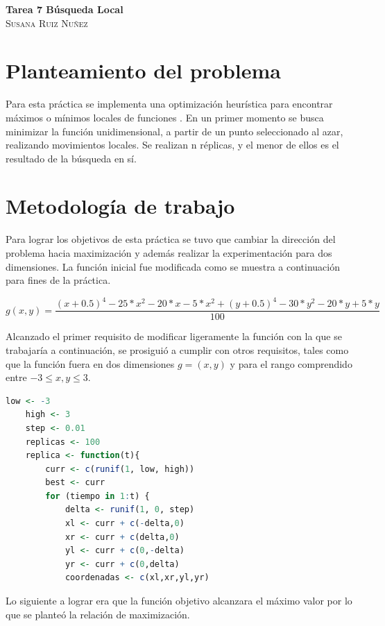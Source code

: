 \documentclass{article}
\begin{document}
	\begin{center}
	\huge{\textbf{Tarea 7 Búsqueda Local}}\\
	
	\textsc{ \Large Susana Ruiz Nuñez}
	\end{center}


\section{Planteamiento del problema} 
Para esta práctica se implementa una optimización heurística para encontrar máximos o mínimos locales de funciones \cite{satu}. En un primer momento se busca minimizar la función unidimensional, a partir de un punto seleccionado al azar, realizando movimientos locales. Se realizan n  réplicas, y el menor de ellos es el resultado de la búsqueda en sí.

\section{Metodología de trabajo}
Para lograr los objetivos de esta práctica se tuvo que cambiar la dirección del problema hacia maximización y además realizar la experimentación para dos dimensiones. La función inicial fue modificada como se muestra a continuación para fines de la práctica. 

\begin{equation}
	\label{eq:e1}
	g(x,y)= \frac{(x + 0.5)^4 - 25 * x^2 - 20 * x - 5 * x^2 + (y + 0.5)^4 - 30 * y^2 - 20 * y + 5 * y}{100} 
\end{equation}

Alcanzado el primer requisito de modificar ligeramente la función con la que se trabajaría a continuación, se prosiguió a cumplir con otros requisitos, tales como que la función fuera en dos dimensiones $g = (x, y)$ y para el rango comprendido entre $-3\leq x,y \leq 3$.
 
\begin{lstlisting}[language=R]
	low <- -3
	high <- 3
	step <- 0.01
	replicas <- 100
	replica <- function(t){
		curr <- c(runif(1, low, high))
		best <- curr
		for (tiempo in 1:t) {
			delta <- runif(1, 0, step)
			xl <- curr + c(-delta,0)
			xr <- curr + c(delta,0)
			yl <- curr + c(0,-delta)
			yr <- curr + c(0,delta)
			coordenadas <- c(xl,xr,yl,yr)
\end{lstlisting}

Lo siguiente a lograr era que la función objetivo alcanzara el máximo valor por lo que se planteó la relación de maximización.
\end{document}

